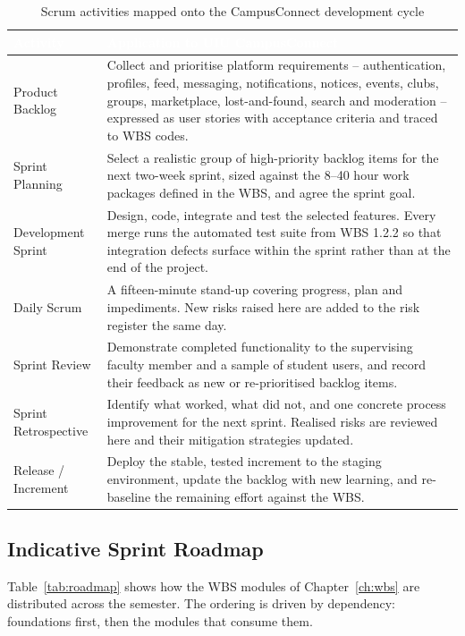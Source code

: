 \documentclass[11pt,a4paper]{report}
\newcommand{\thead}[1]{\textcolor{white}{\sffamily\bfseries #1}}
\newcommand{\rowhead}{\rowcolor{headRow}}
\begin{document}
\begin{table}[htbp]
\centering
\caption{Scrum activities mapped onto the CampusConnect development cycle}
\label{tab:scrumcycle}
\begin{tabular}{|L{3.4cm}|L{11.0cm}|}
\hline
\rowhead \thead{Activity} & \thead{Application to UIU CampusConnect} \\ \hline
Product Backlog &
Collect and prioritise platform requirements -- authentication, profiles, feed,
messaging, notifications, notices, events, clubs, groups, marketplace,
lost-and-found, search and moderation -- expressed as user stories with
acceptance criteria and traced to WBS codes. \\ \hline
{}
Sprint Planning &
Select a realistic group of high-priority backlog items for the next two-week
sprint, sized against the 8--40 hour work packages defined in the WBS, and agree
the sprint goal. \\ \hline
Development Sprint &
Design, code, integrate and test the selected features. Every merge runs the
automated test suite from WBS 1.2.2 so that integration defects surface within
the sprint rather than at the end of the project. \\ \hline
{}
Daily Scrum &
A fifteen-minute stand-up covering progress, plan and impediments. New risks
raised here are added to the risk register the same day. \\ \hline
Sprint Review &
Demonstrate completed functionality to the supervising faculty member and a
sample of student users, and record their feedback as new or re-prioritised
backlog items. \\ \hline
{}
Sprint Retrospective &
Identify what worked, what did not, and one concrete process improvement for the
next sprint. Realised risks are reviewed here and their mitigation strategies
updated. \\ \hline
Release / Increment &
Deploy the stable, tested increment to the staging environment, update the
backlog with new learning, and re-baseline the remaining effort against the WBS. \\ \hline
\end{tabular}
\end{table}

\subsection{Indicative Sprint Roadmap}
\label{sec:roadmap}

Table~\ref{tab:roadmap} shows how the WBS modules of Chapter~\ref{ch:wbs} are
distributed across the semester. The ordering is driven by dependency:
foundations first, then the modules that consume them.
\end{document}
